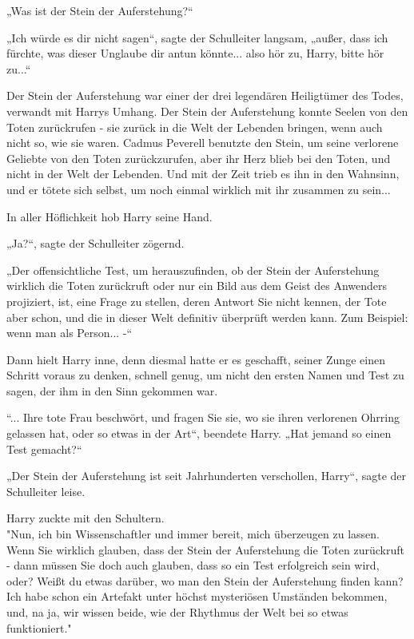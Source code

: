 {„Was ist der Stein der Auferstehung?“

„Ich würde es dir nicht sagen“, sagte der Schulleiter langsam, „außer, dass ich fürchte, was dieser Unglaube dir antun könnte... also hör zu, Harry, bitte hör zu...“

Der Stein der Auferstehung war einer der drei legendären Heiligtümer des Todes, verwandt mit Harrys Umhang. Der Stein der Auferstehung konnte Seelen von den Toten zurückrufen - sie zurück in die Welt der Lebenden bringen, wenn auch nicht so, wie sie waren. Cadmus Peverell benutzte den Stein, um seine verlorene Geliebte von den Toten zurückzurufen, aber ihr Herz blieb bei den Toten, und nicht in der Welt der Lebenden. Und mit der Zeit trieb es ihn in den Wahnsinn, und er tötete sich selbst, um noch einmal wirklich mit ihr zusammen zu sein...

In aller Höflichkeit hob Harry seine Hand.

„Ja?“, sagte der Schulleiter zögernd.

„Der offensichtliche Test, um herauszufinden, ob der Stein der Auferstehung wirklich die Toten zurückruft oder nur ein Bild aus dem Geist des Anwenders projiziert, ist, eine Frage zu stellen, deren Antwort Sie nicht kennen, der Tote aber schon, und die in dieser Welt definitiv überprüft werden kann. Zum Beispiel: wenn man als Person... -“

Dann hielt Harry inne, denn diesmal hatte er es geschafft, seiner Zunge einen Schritt voraus zu denken, schnell genug, um nicht den ersten Namen und Test zu sagen, der ihm in den Sinn gekommen war.

“... Ihre tote Frau beschwört, und fragen Sie sie, wo sie ihren verlorenen Ohrring gelassen hat, oder so etwas in der Art“, beendete Harry. „Hat jemand so einen Test gemacht?“

„Der Stein der Auferstehung ist seit Jahrhunderten verschollen, Harry“, sagte der Schulleiter leise.

Harry zuckte mit den Schultern.\\ "Nun, ich bin Wissenschaftler und immer bereit, mich überzeugen zu lassen. Wenn Sie wirklich glauben, dass der Stein der Auferstehung die Toten zurückruft - dann müssen Sie doch auch glauben, dass so ein Test erfolgreich sein wird, oder? Weißt du etwas darüber, wo man den Stein der Auferstehung finden kann? Ich habe schon ein Artefakt unter höchst mysteriösen Umständen bekommen, und, na ja, wir wissen beide, wie der Rhythmus der Welt bei so etwas funktioniert."

}
